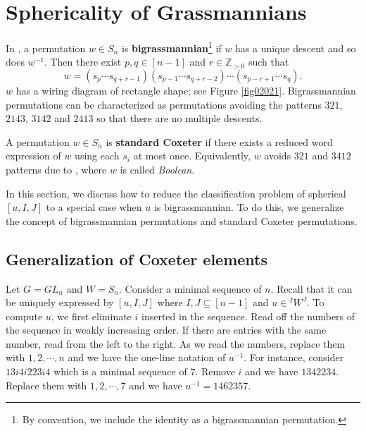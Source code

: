 \documentclass[12pt]{amsart}
\theoremstyle{definition}
\theoremstyle{remark}
\newcommand{\Z}{\mathbb{Z}}
\begin{document}
\section{Sphericality of Grassmannians}\label{sec6}

In \cite{MR1395667}, a permutation $w \in S_n$ is \textbf{bigrassmannian}\footnote{By convention, we include the identity as a bigrassmannian permutation.} if $w$ has a unique descent and so does $w^{-1}$. Then there exist $p , q \in [n-1]$ and $r \in \Z_{>0}$ such that
\begin{equation}
w = (s_{p} \cdots s_{q+r-1})(s_{p-1}\cdots s_{q+r-2} )\cdots (s_{p-r+1} \cdots s_q).
\end{equation}
$w$ has a wiring diagram of rectangle shape; see Figure \ref{fig02021}. Bigrassmannian permutations can be characterized as permutations avoiding the patterns $321$, $2143$, $3142$ and $2413$ so that there are no multiple descents.

A permutation $w \in S_n$ is \textbf{standard Coxeter} if there exists a reduced word expression of $w$ using each $s_i$ at most once. Equivalently, $w$ avoids $321$ and $3412$ patterns due to \cite[Theorem 4.3]{MR2333139}, where $w$ is called \textit{Boolean}.

In this section, we discuss how to reduce the classification problem of spherical $[u,I,J]$ to a special case when $u$ is bigrassmannian. To do this, we generalize the concept of bigrassmannian permutations and standard Coxeter permutations.

\subsection{Generalization of Coxeter elements} 

Let $G = GL_n$ and $W = S_n$. Consider a minimal sequence of $n$. Recall that it can be uniquely expressed by $[u,I,J]$ where $I, J \subseteq [n-1]$ and $u \in {}^I W^J$. To compute $u$, we first eliminate $i$ inserted in the sequence. Read off the numbers of the sequence in weakly increasing order. If there are entries with the same number, read from the left to the right. As we read the numbers, replace them with $1,2, \cdots , n$ and we have the one-line notation of $u^{-1}$. For instance, consider $13i4i223i4$ which is a minimal sequence of $7$. Remove $i$ and we have $1342234$. Replace them with $1,2, \cdots ,7$ and we have $u^{-1} = 1462357$.
\end{document}
